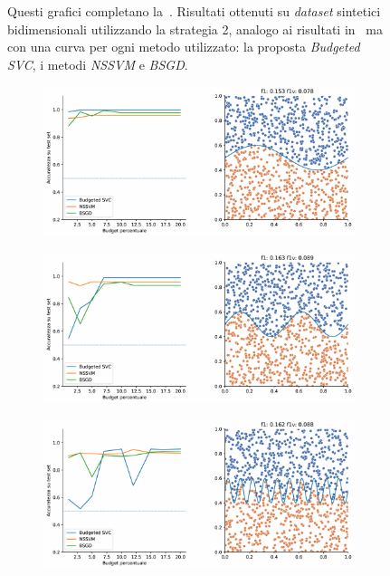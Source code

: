 \begin{appendices}
\begin{figure}[ht]
\begin{subfigure}{.8\textwidth}
    \end{subfigure}
     \caption[]{Questi grafici completano la~. Risultati ottenuti su \emph{dataset} sintetici bidimensionali utilizzando la strategia 2, analogo ai risultati in~ ma con una curva per ogni metodo utilizzato: la proposta \emph{Budgeted SVC}, i metodi \emph{NSSVM} e \emph{BSGD}.}
\end{figure}
\begin{figure}[ht]\ContinuedFloat
    \centering
    \begin{subfigure}{.8\textwidth}
        \centering
        \includegraphics[width=\textwidth]{img/comp_new/10.pdf}
    \end{subfigure}%
    \hfill
    \begin{subfigure}{.8\textwidth}
        \centering
        \includegraphics[width=\textwidth]{img/comp_new/11.pdf}
    \end{subfigure}
    \hfill
    \begin{subfigure}{.8\textwidth}
        \centering
        \includegraphics[width=\textwidth]{img/comp_new/13.pdf}

\end{subfigure}
\end{figure}
\end{appendices}
